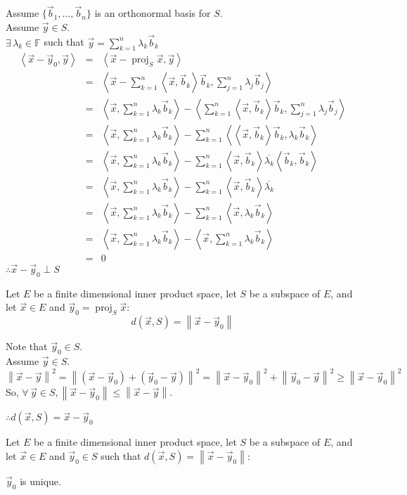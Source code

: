 \documentclass[letterpaper,12pt,fleqn]{article}
\newcommand{\vb}{\vec{b}}
\newcommand{\vx}{\vec{x}}
\newcommand{\vy}{\vec{y}}
\newcommand{\norm}[1]{\left\|#1\right\|}
\newcommand{\inner}[1]{\left<#1\right>}
\newcommand{\conj}[1]{\overline{#1}}
\newcommand{\F}{\mathbb{F}}
\renewcommand{\l}{\lambda}
\DeclareMathOperator{\proj}{proj}
\begin{document}
\begin{theproof}
  Assume $\{\vb_1,\ldots,\vb_n\}$ is an orthonormal basis for $S$. \\
  Assume $\vy\in S$. \\
  $\exists\,\l_k\in\F$ such that $\vy=\sum_{k=1}^n\l_k\vb_k$ \\
  \begin{eqnarray*}
    \inner{\vx-\vy_0,\vy} &=& \inner{\vx-\proj_S{\vx},\vy} \\
    &=& \inner{\vx-\sum_{k=1}^n\inner{\vx,\vb_k}\vb_k,\sum_{j=1}^n\l_j\vb_j} \\
    &=& \inner{\vx,\sum_{k=1}^n\l_k\vb_k}-
    \inner{\sum_{k=1}^n\inner{\vx,\vb_k}\vb_k,\sum_{j=1}^n\l_j\vb_j} \\
    &=& \inner{\vx,\sum_{k=1}^n\l_k\vb_k}-
    \sum_{k=1}^n\inner{\inner{\vx,\vb_k}\vb_k,\l_k\vb_k} \\
    &=& \inner{\vx,\sum_{k=1}^n\l_k\vb_k}-
    \sum_{k=1}^n\inner{\vx,\vb_k}\conj{\l_k}\inner{\vb_k,\vb_k} \\
    &=& \inner{\vx,\sum_{k=1}^n\l_k\vb_k}-
    \sum_{k=1}^n\inner{\vx,\vb_k}\conj{\l_k} \\
    &=& \inner{\vx,\sum_{k=1}^n\l_k\vb_k}-\sum_{k=1}^n\inner{\vx,\l_k\vb_k} \\
    &=& \inner{\vx,\sum_{k=1}^n\l_k\vb_k}-\inner{\vx,\sum_{k=1}^n\l_k\vb_k} \\
    &=& 0
  \end{eqnarray*}
  $\therefore\vx-\vy_0\perp S$
\end{theproof}

\begin{theorem}
  Let $E$ be a finite dimensional inner product space, let $S$ be a subspace of
  $E$, and let $\vx\in E$ and $\vy_0=\proj_S\vx$:
  \[d(\vx,S)=\norm{\vx-\vy_0}\]
\end{theorem}

\begin{theproof}
  Note that $\vy_0\in S$. \\
  Assume $\vy\in S$. \\
  $\norm{\vx-\vy}^2=\norm{(\vx-\vy_0)+(\vy_0-\vy)}^2=
  \norm{\vx-\vy_0}^2+\norm{\vy_0-\vy}^2\ge\norm{\vx-\vy_0}^2$ \\
  So, $\forall\,\vy\in S,\norm{\vx-\vy_0}\le\norm{\vx-\vy}$.

  $\therefore d(\vx,S)=\vx-\vy_0$
\end{theproof}

\newpage

\begin{corollary}
  Let $E$ be a finite dimensional inner product space, let $S$ be a subspace of
  $E$, and let $\vx\in E$ and $\vy_0\in S$ such that
  $d(\vx,S)=\norm{\vx-\vy_0}$:

  \qquad$\vy_0$ is unique.
\end{corollary}
\end{document}
